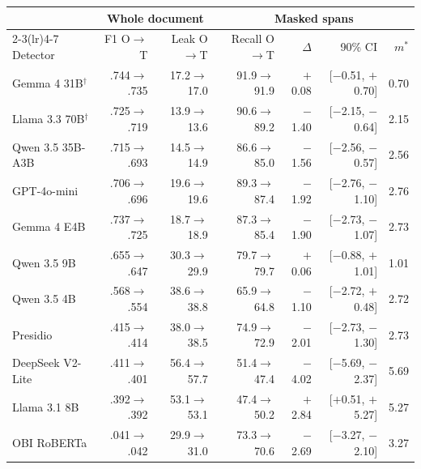 \begin{tabular}{lrrrrrr}
\toprule
 & \multicolumn{2}{c}{Whole document} & \multicolumn{4}{c}{Masked spans}\\
\cmidrule(lr){2-3}\cmidrule(lr){4-7}
Detector & F1 O$\rightarrow$T & Leak O$\rightarrow$T & Recall O$\rightarrow$T & $\Delta$ & 90\% CI & $m^\ast$\\
\midrule
Gemma 4 31B$^\dagger$ & .744$\rightarrow$.735 & 17.2$\rightarrow$17.0 & 91.9$\rightarrow$91.9 & $+$0.08 & [$-$0.51, $+$0.70] & 0.70\\
Llama 3.3 70B$^\dagger$ & .725$\rightarrow$.719 & 13.9$\rightarrow$13.6 & 90.6$\rightarrow$89.2 & $-$1.40 & [$-$2.15, $-$0.64] & 2.15\\
Qwen 3.5 35B-A3B & .715$\rightarrow$.693 & 14.5$\rightarrow$14.9 & 86.6$\rightarrow$85.0 & $-$1.56 & [$-$2.56, $-$0.57] & 2.56\\
GPT-4o-mini & .706$\rightarrow$.696 & 19.6$\rightarrow$19.6 & 89.3$\rightarrow$87.4 & $-$1.92 & [$-$2.76, $-$1.10] & 2.76\\
Gemma 4 E4B & .737$\rightarrow$.725 & 18.7$\rightarrow$18.9 & 87.3$\rightarrow$85.4 & $-$1.90 & [$-$2.73, $-$1.07] & 2.73\\
Qwen 3.5 9B & .655$\rightarrow$.647 & 30.3$\rightarrow$29.9 & 79.7$\rightarrow$79.7 & $+$0.06 & [$-$0.88, $+$1.01] & 1.01\\
Qwen 3.5 4B & .568$\rightarrow$.554 & 38.6$\rightarrow$38.8 & 65.9$\rightarrow$64.8 & $-$1.10 & [$-$2.72, $+$0.48] & 2.72\\
Presidio & .415$\rightarrow$.414 & 38.0$\rightarrow$38.5 & 74.9$\rightarrow$72.9 & $-$2.01 & [$-$2.73, $-$1.30] & 2.73\\
DeepSeek V2-Lite & .411$\rightarrow$.401 & 56.4$\rightarrow$57.7 & 51.4$\rightarrow$47.4 & $-$4.02 & [$-$5.69, $-$2.37] & 5.69\\
Llama 3.1 8B & .392$\rightarrow$.392 & 53.1$\rightarrow$53.1 & 47.4$\rightarrow$50.2 & $+$2.84 & [$+$0.51, $+$5.27] & 5.27\\
OBI RoBERTa & .041$\rightarrow$.042 & 29.9$\rightarrow$31.0 & 73.3$\rightarrow$70.6 & $-$2.69 & [$-$3.27, $-$2.10] & 3.27\\
\bottomrule
\end{tabular}
